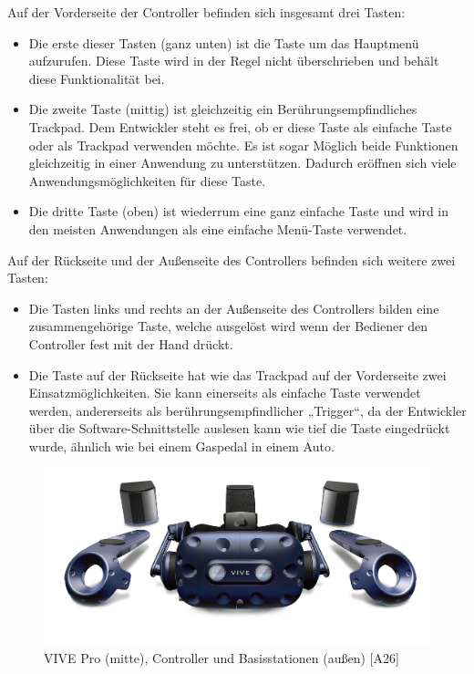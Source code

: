 \newline
Auf der Vorderseite der Controller befinden sich insgesamt drei Tasten:
\begin{itemize}
	\item Die erste dieser Tasten (ganz unten) ist die Taste um das Hauptmenü aufzurufen. Diese 
	Taste wird in der Regel nicht überschrieben und behält diese Funktionalität bei.
	\item Die zweite Taste (mittig) ist gleichzeitig ein Berührungsempfindliches Trackpad. Dem 
	Entwickler steht es frei, ob er diese Taste als einfache Taste oder als Trackpad verwenden 
	möchte. Es ist sogar Möglich beide Funktionen gleichzeitig in einer Anwendung zu 
	unterstützen. Dadurch eröffnen sich viele Anwendungsmöglichkeiten für diese Taste.
	\item Die dritte Taste (oben) ist wiederrum eine ganz einfache Taste und wird in den meisten 
	Anwendungen als eine einfache Menü-Taste verwendet.
\end{itemize}
Auf der Rückseite und der Außenseite des Controllers befinden sich weitere zwei Tasten: 
\begin{itemize}
	\item Die Tasten links und rechts an der Außenseite des Controllers bilden eine 
	zusammengehörige Taste, welche ausgelöst wird wenn der Bediener den Controller fest mit 
	der Hand drückt.
	\item Die Taste auf der Rückseite hat wie das Trackpad auf der Vorderseite zwei 
	Einsatzmöglichkeiten. Sie kann einerseits als einfache Taste verwendet werden, andererseits 
	als berührungsempfindlicher „Trigger“, da der Entwickler über die Software-Schnittstelle 
	auslesen kann wie tief die Taste eingedrückt wurde, ähnlich wie bei einem Gaspedal in
	einem Auto.
\end{itemize}
\begin{figure}[h]
	\centering
	\includegraphics[width=0.7\linewidth]{Bilder/A26_Vivepro}
	\caption{VIVE Pro (mitte), Controller und Basisstationen (außen) [A26]}
	\label{fig:ViveproKit}
\end{figure}
